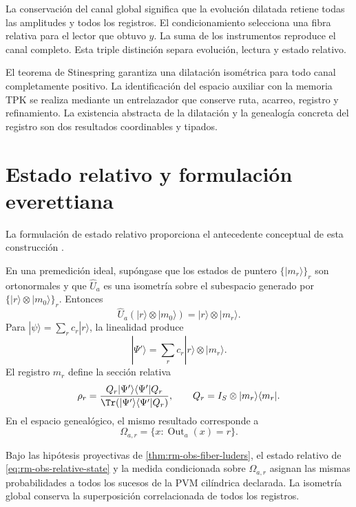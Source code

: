La conservaci\'on del canal global significa que la evoluci\'on dilatada
retiene todas las amplitudes y todos los registros. El condicionamiento
selecciona una fibra relativa para el lector que obtuvo \(y\). La suma de
los instrumentos reproduce el canal completo. Esta triple distinci\'on
separa evoluci\'on, lectura y estado relativo.

El teorema de Stinespring \cite{Stinespring1955} garantiza una dilataci\'on isom\'etrica para todo
canal completamente positivo. La identificaci\'on del espacio auxiliar con
la memoria TPK se realiza mediante un entrelazador que conserve ruta,
acarreo, registro y refinamiento. La existencia abstracta de la dilataci\'on
y la genealog\'ia concreta del registro son dos resultados coordinables y
tipados.

\section{Estado relativo y formulaci\'on everettiana}

La formulaci\'on de estado relativo proporciona el antecedente conceptual
de esta construcci\'on \cite{Everett1957}.

En una premedici\'on ideal, sup\'ongase que los estados de puntero
\(\{|m_r\rangle\}_r\) son ortonormales y que \(\widehat U_a\) es una
isometr\'ia sobre el subespacio generado por
\(\{|r\rangle\otimes|m_0\rangle\}_r\). Entonces
\begin{equation}
 \widehat U_a(|r\rangle\otimes|m_0\rangle)
 =|r\rangle\otimes|m_r\rangle.
 \label{eq:rm-obs-ideal-premeasurement}
\end{equation}
Para \(|\psi\rangle=\sum_r c_r|r\rangle\), la linealidad produce
\begin{equation}
 |\Psi'\rangle
 =\sum_r c_r|r\rangle\otimes|m_r\rangle.
 \label{eq:rm-obs-entangled-record}
\end{equation}
El registro \(m_r\) define la secci\'on relativa
\begin{equation}
 \rho_r
 =\frac{Q_r|\Psi'\rangle\langle\Psi'|Q_r}
 {\Tr(|\Psi'\rangle\langle\Psi'|Q_r)},
 \qquad
 Q_r=I_S\otimes|m_r\rangle\langle m_r|.
 \label{eq:rm-obs-relative-state}
\end{equation}
En el espacio geneal\'ogico, el mismo resultado corresponde a
\begin{equation}
 \Omega_{a,r}
 =\{x:\operatorname{Out}_a(x)=r\}.
 \label{eq:rm-obs-relative-fiber}
\end{equation}

\begin{theorem}
\label{thm:rm-obs-everett-correspondence}
Bajo las hip\'otesis proyectivas de
\cref{thm:rm-obs-fiber-luders}, el estado relativo de
\cref{eq:rm-obs-relative-state} y la medida condicionada sobre
\(\Omega_{a,r}\) asignan las mismas probabilidades a todos los sucesos de
la PVM cil\'indrica declarada. La isometr\'ia global conserva la superposici\'on
correlacionada de todos los registros.
\end{theorem}

